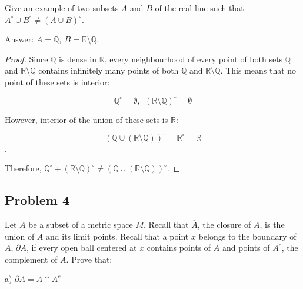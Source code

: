 \documentclass{article}
\begin{document}
\begin{tcolorbox}
Give an example of two subsets $A$ and $B$ of the real line such that $A^\circ \cup B^\circ \neq (A \cup B)^\circ $.
\end{tcolorbox}

Answer: $A = \mathbb{Q}, \> B = \mathbb{R} \setminus \mathbb{Q}$.

\begin{proof}
Since $\mathbb{Q}$ is dense in $\mathbb{R}$, every neighbourhood of every point of both sets $\mathbb{Q}$ and $\mathbb{R} \setminus \mathbb{Q}$ contains infinitely many points of both $\mathbb{Q}$ and $\mathbb{R} \setminus \mathbb{Q}$. This means that no point of these sets is interior:

$$ \mathbb{Q}^\circ = \emptyset, \>\> (\mathbb{R} \setminus \mathbb{Q})^\circ = \emptyset $$

However, interior of the union of these sets is $\mathbb{R}$:

$$(\mathbb{Q} \cup (\mathbb{R} \setminus \mathbb{Q}))^\circ = \mathbb{R}^\circ = \mathbb{R}$$.

Therefore, $\mathbb{Q}^\circ + (\mathbb{R} \setminus \mathbb{Q})^\circ \neq (\mathbb{Q} \cup (\mathbb{R} \setminus \mathbb{Q}))^\circ. $
\end{proof}


\subsection*{Problem 4}

\begin{tcolorbox}
Let $A$ be a subset of a metric space $M$. Recall that $\overline{A}$, the closure of $A$, is the union of
$A$ and its limit points. Recall that a point $x$ belongs to the boundary of $A$, $\partial A$, if every open ball centered at $x$ contains points of $A$ and points of $A^c$, the complement of $A$. Prove that:

a) $\partial A = \overline{A} \cap \overline{A^c}$
\end{tcolorbox}
\end{document}
